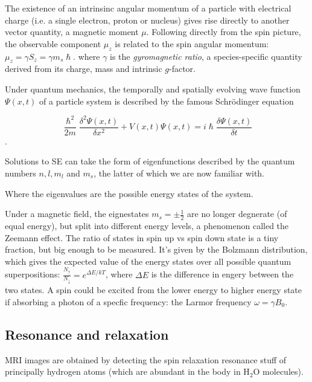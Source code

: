 The existence of an intrinsinc angular momentum of a particle with electrical charge (i.e. a single electron, proton or nucleus) gives rise directly to another vector quantity, a magnetic moment $\mu$.
Following directly from the spin picture, the observable component $\mu_z$ is related to the spin angular momentum: $\mu_z = \gamma S_z = \gamma m_s \hslash$.
where $\gamma$ is the \textit{gyromagnetic ratio}, a species-specific quantity derived from its charge, mass and intrinsic $g$-factor.

Under quantum mechanics, the temporally and spatially evolving wave function $\Psi(x,t)$ of a particle system is described by the famous Schrödinger equation

\begin{equation}
  \frac{\hslash^2}{2m}\frac{\delta^2 \Psi(x,t)}{\delta x^2} + V(x,t)\Psi(x,t) = i\hslash \frac{\delta \Psi(x,t)}{\delta t}
\end{equation}.

Solutions to SE can take the form of eigenfunctions described by the quantum numbers $n,l,m_l$ and $m_s$, the latter of which we are now familiar with.

Where the eigenvalues are the possible energy states of the system.

Under a magnetic field, the eignestates $m_s = \pm \frac{1}{2}$ are no longer degnerate (of equal energy), but split into different energy levels, a phenomenon called the Zeemann effect.
The ratio of states in spin up vs spin down state is a tiny fraction, but big enough to be measured.
It's given by the Bolzmann distribution, which gives the expected value of the energy states over all possible quantum superpositions:
$\frac{N_{\uparrow}}{N_{\downarrow}} = e^{\Delta E / k T}$, where $\Delta E$ is the difference in engery between the two states.
A spin could be excited from the lower energy to higher energy state if absorbing a photon of a specfic frequency: the Larmor frequency $\omega = \gamma B_0$.



\subsection{Resonance and relaxation}


MRI images are obtained by detecting the spin relaxation resonance stuff of principally hydrogen atoms (which are abundant in the body in H$_2$O molecules).

